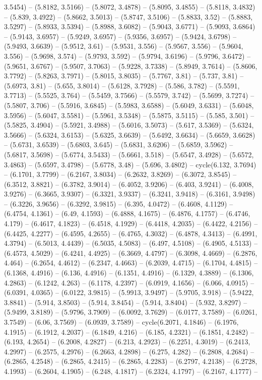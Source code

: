3.5454) -- (5.8182, 3.5166) -- (5.8072, 3.4878) -- (5.8095, 3.4855) -- (5.8118, 3.4832) -- (5.839, 3.4922) -- (5.8662, 3.5013) -- (5.8747, 3.5106) -- (5.8833, 3.52) -- (5.8883, 3.5297) -- (5.8933, 3.5394) -- (5.8988, 3.6082) -- (5.9043, 3.6771) -- (5.9093, 3.6864) -- (5.9143, 3.6957) -- (5.9249, 3.6957) -- (5.9356, 3.6957) -- (5.9424, 3.6798) -- (5.9493, 3.6639) -- (5.9512, 3.61) -- (5.9531, 3.556) -- (5.9567, 3.556) -- (5.9604, 3.556) -- (5.9698, 3.574) -- (5.9793, 3.592) -- (5.9794, 3.6196) -- (5.9796, 3.6472) -- (5.9651, 3.6767) -- (5.9507, 3.7063) -- (5.9228, 3.7338) -- (5.8949, 3.7614) -- (5.8606, 3.7792) -- (5.8263, 3.7971) -- (5.8015, 3.8035) -- (5.7767, 3.81) -- (5.737, 3.81) -- (5.6973, 3.81) -- (5.655, 3.8014) -- (5.6128, 3.7928) -- (5.586, 3.782) -- (5.5591, 3.7713) -- (5.5525, 3.764) -- (5.5459, 3.7566) -- (5.5579, 3.742) -- (5.5699, 3.7274) -- (5.5807, 3.706) -- (5.5916, 3.6845) -- (5.5983, 3.6588) -- (5.6049, 3.6331) -- (5.6048, 3.5956) -- (5.6047, 3.5581) -- (5.5961, 3.5348) -- (5.5875, 3.5115) -- (5.585, 3.501) -- (5.5825, 3.4904) -- (5.5921, 3.4988) -- (5.6016, 3.5073) -- (5.617, 3.5369) -- (5.6324, 3.5666) -- (5.6324, 3.6153) -- (5.6325, 3.6639) -- (5.6492, 3.6634) -- (5.6659, 3.6628) -- (5.6731, 3.6539) -- (5.6803, 3.645) -- (5.6831, 3.6206) -- (5.6859, 3.5962) -- (5.6817, 3.5698) -- (5.6774, 3.5433) -- (5.6661, 3.518) -- (5.6547, 3.4928) -- (5.6572, 3.4863) -- (5.6597, 3.4798) -- (5.6778, 3.48) -- (5.696, 3.4802) -- cycle(6.132, 3.7694) -- (6.1701, 3.7799) -- (6.2167, 3.8034) -- (6.2632, 3.8269) -- (6.3072, 3.8545) -- (6.3512, 3.8821) -- (6.3782, 3.9014) -- (6.4052, 3.9206) -- (6.403, 3.9241) -- (6.4008, 3.9276) -- (6.3665, 3.9307) -- (6.3321, 3.9337) -- (6.3241, 3.9418) -- (6.3161, 3.9498) -- (6.3226, 3.9656) -- (6.3292, 3.9815) -- (6.395, 4.0472) -- (6.4608, 4.1129) -- (6.4754, 4.1361) -- (6.49, 4.1593) -- (6.4888, 4.1675) -- (6.4876, 4.1757) -- (6.4746, 4.179) -- (6.4617, 4.1823) -- (6.4518, 4.1929) -- (6.4418, 4.2035) -- (6.4422, 4.2156) -- (6.4425, 4.2277) -- (6.4595, 4.2655) -- (6.4765, 4.3032) -- (6.4878, 4.3413) -- (6.4991, 4.3794) -- (6.5013, 4.4439) -- (6.5035, 4.5083) -- (6.497, 4.5108) -- (6.4905, 4.5133) -- (6.4573, 4.5029) -- (6.4241, 4.4925) -- (6.3669, 4.4797) -- (6.3098, 4.4669) -- (6.2876, 4.464) -- (6.2654, 4.4612) -- (6.2347, 4.4663) -- (6.2039, 4.4715) -- (6.1704, 4.4815) -- (6.1368, 4.4916) -- (6.136, 4.4916) -- (6.1351, 4.4916) -- (6.1329, 4.3889) -- (6.1306, 4.2863) -- (6.1242, 4.263) -- (6.1178, 4.2397) -- (6.0919, 4.1656) -- (6.066, 4.0915) -- (6.0391, 4.0365) -- (6.0122, 3.9815) -- (5.9913, 3.9497) -- (5.9705, 3.918) -- (5.9422, 3.8841) -- (5.914, 3.8503) -- (5.914, 3.8454) -- (5.914, 3.8404) -- (5.932, 3.8297) -- (5.9499, 3.8189) -- (5.9796, 3.7909) -- (6.0092, 3.7629) -- (6.0177, 3.7589) -- (6.0261, 3.7549) -- (6.06, 3.7569) -- (6.0939, 3.7589) -- cycle(6.2071, 4.1846) -- (6.1976, 4.1915) -- (6.1912, 4.2037) -- (6.1849, 4.216) -- (6.185, 4.2321) -- (6.1851, 4.2482) -- (6.193, 4.2654) -- (6.2008, 4.2827) -- (6.213, 4.2923) -- (6.2251, 4.3019) -- (6.2413, 4.2997) -- (6.2575, 4.2976) -- (6.2663, 4.2898) -- (6.275, 4.282) -- (6.2808, 4.2684) -- (6.2865, 4.2548) -- (6.2865, 4.2415) -- (6.2865, 4.2283) -- (6.2797, 4.2138) -- (6.2728, 4.1993) -- (6.2604, 4.1905) -- (6.248, 4.1817) -- (6.2324, 4.1797) -- (6.2167, 4.1777) -- 